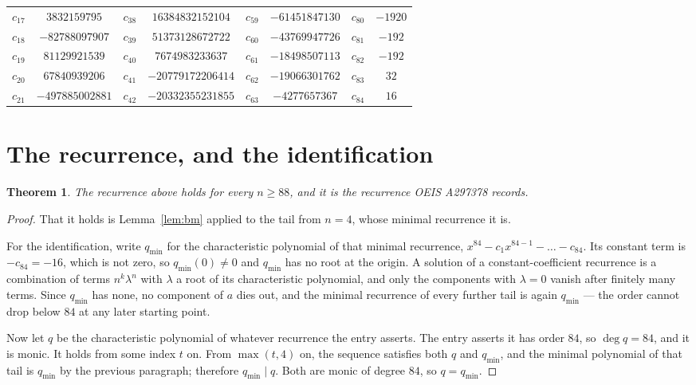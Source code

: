 \documentclass[11pt,a4paper]{article}
\theoremstyle{plain}
\newtheorem{theorem}{Theorem}
\theoremstyle{definition}
\begin{document}
\begin{center}
\begin{tabular}{cccccccc}
$c_{17}$ & $3832159795$ & $c_{38}$ & $16384832152104$ & $c_{59}$ & $-61451847130$ & $c_{80}$ & $-1920$ \\
$c_{18}$ & $-82788097907$ & $c_{39}$ & $51373128672722$ & $c_{60}$ & $-43769947726$ & $c_{81}$ & $-192$ \\
$c_{19}$ & $81129921539$ & $c_{40}$ & $7674983233637$ & $c_{61}$ & $-18498507113$ & $c_{82}$ & $-192$ \\
$c_{20}$ & $67840939206$ & $c_{41}$ & $-20779172206414$ & $c_{62}$ & $-19066301762$ & $c_{83}$ & $32$ \\
$c_{21}$ & $-497885002881$ & $c_{42}$ & $-20332355231855$ & $c_{63}$ & $-4277657367$ & $c_{84}$ & $16$ \\
\end{tabular}
\end{center}

\section{The recurrence, and the identification}

\begin{theorem}
The recurrence above holds for every $n\ge88$, and it is the recurrence OEIS A297378 records.
\end{theorem}

\begin{proof}
That it holds is Lemma~\ref{lem:bm} applied to the tail from $n=4$, whose minimal
recurrence it is.

For the identification, write $q_{\min}$ for the characteristic polynomial of that minimal
recurrence, $x^{84}-c_1x^{84-1}-\dots-c_{84}$. Its constant term is
$-c_{84}=-16$, which is not zero, so $q_{\min}(0)\neq0$ and $q_{\min}$ has no
root at the origin. A solution of a constant-coefficient recurrence is a combination of terms
$n^{k}\lambda^{n}$ with $\lambda$ a root of its characteristic polynomial, and only the
components with $\lambda=0$ vanish after finitely many terms. Since $q_{\min}$ has none, no
component of $a$ dies out, and the minimal recurrence of every further tail is again
$q_{\min}$ --- the order cannot drop below $84$ at any later starting point.

Now let $q$ be the characteristic polynomial of whatever recurrence the entry asserts. The
entry asserts it has order $84$, so $\deg q=84$, and it is monic. It holds from some
index $t$ on. From $\max(t,4)$ on, the sequence satisfies both $q$ and $q_{\min}$, and
the minimal polynomial of that tail is $q_{\min}$ by the previous paragraph; therefore
$q_{\min}\mid q$. Both are monic of degree $84$, so $q=q_{\min}$.
\end{proof}
\end{document}

